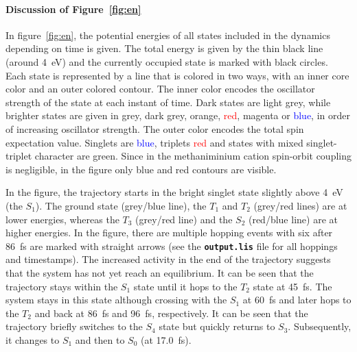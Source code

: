 \documentclass[a4paper,11pt,DIV=15,openany]{scrbook}
\newcommand{\ttt}[1]{\textbf{\texttt{#1}}}
\begin{document}
\paragraph{Discussion of Figure~\ref{fig:en}}

In figure~\ref{fig:en}, the potential energies of all states included in the dynamics depending on time is given. 
The total energy is given by the thin black line (around 4~eV) and the currently occupied state is marked with black circles. 
Each state is represented by a line that is colored in two ways, with an inner core color and an outer colored contour.
The inner color encodes the oscillator strength of the state at each instant of time. 
Dark states are \textcolor{black!20}{light grey}, while brighter states are given in \textcolor{black!40}{grey}, \textcolor{black!70}{dark grey}, \textcolor{red!60!green}{orange}, \textcolor{red}{red}, \textcolor{red!50!blue}{magenta} or \textcolor{blue}{blue}, in order of increasing oscillator strength. 
The outer color encodes the total spin expectation value. 
Singlets are \textcolor{blue}{blue}, triplets \textcolor{red}{red} and states with mixed singlet-triplet character are \textcolor{green!90!black}{green}. 
Since in the methaniminium cation spin-orbit coupling is negligible, in the figure only blue and red contours are visible.

In the figure, the trajectory starts in the bright singlet state slightly above 4~eV (the $S_1$).
The ground state (grey/blue line), the $T_1$ and $T_2$ (grey/red lines) are at lower energies, whereas the $T_3$ (grey/red line) and the $S_2$ (red/blue line) are at higher energies.
In the figure, there are multiple hopping events with six after 86~fs are marked with straight arrows (see the \ttt{output.lis} file for all hoppings and timestamps). The increased activity in the end of the trajectory suggests that the system has not yet reach an equilibrium. 
It can be seen that the trajectory stays within the $S_1$ state until it hops to the $T_2$ state at 45~fs. 
The system stays in this state although crossing with the $S_1$ at 60~fs and later hops to the $T_2$ and back at 86~fs and 96~fs, respectively.
It can be seen that the trajectory briefly switches to the $S_4$ state but quickly returns to $S_3$.
Subsequently, it changes to $S_1$ and then to $S_0$ (at 17.0~fs).
\end{document}
